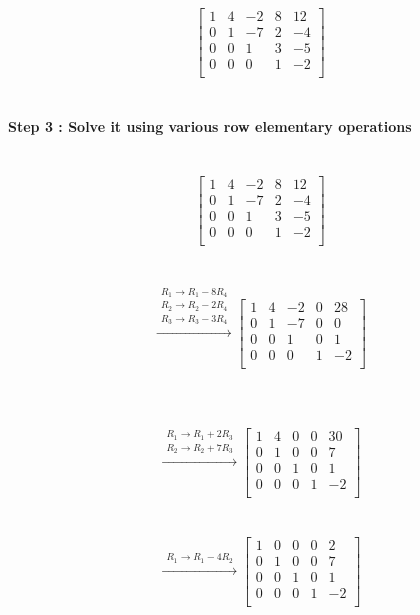 \documentclass[15pt]{article}
\begin{document}
\[
 \left[\begin{array}{rrrr|r}
1 &  4 & -2 & 8 & 12\\
0 & 1 &  -7 & 2 & -4\\
0 & 0 & 1  & 3 & -5\\
0 & 0 & 0 & 1 & -2\\
   \end{array} \right]
\]\\
\\
\textbf{Step 3 : Solve it using various row elementary operations }\\
\\
\\
\[
\left[\begin{array}{rrrr|r}
1 &  4 & -2 & 8 & 12\\
0 & 1 &  -7 & 2 & -4\\
0 & 0 & 1  & 3 & -5\\
0 & 0 & 0 & 1 & -2\\
  \end{array}\right]
  \]
  \\
  \\
  \[
  \xrightarrow{\substack{R_1 \rightarrow R_1 - 8R_4 \\ R_2 \rightarrow R_2 - 2R_4 \\ R_3 \rightarrow R_3 - 3R_4}}
  \left[\begin{array}{rrrr|r}
1 & 4 & -2 & 0 & 28\\
0 & 1 & -7 & 0 &  0\\
0 & 0 &  1 & 0 &  1\\
0 & 0 &  0 & 1 & -2\\
  
  \end{array}\right]
  \]
  \\
  \\
  \
  \[
 \xrightarrow{\substack{R_1 \rightarrow R_1 + 2 R_3 \\ R_2 \rightarrow R_2 + 7R_3}}
\left[\begin{array}{rrrr|r}
1 & 4 &  0 & 0 & 30\\
0 & 1 &  0 & 0 &  7\\
0 & 0 &  1 & 0 &  1\\
0 & 0 &  0 & 1 & -2\\
  \end{array}\right]
  \]\\
  \\
  \[
 \xrightarrow{\substack{R_1 \rightarrow R_1 - 4R_2}}
\left[\begin{array}{rrrr|r}
1 & 0 &  0 & 0 &  2\\
0 & 1 &  0 & 0 &  7\\
0 & 0 &  1 & 0 &  1\\
0 & 0 &  0 & 1 & -2\\
  \end{array}\right]
  \]\\
  \\
  \\
  
\end{document}
